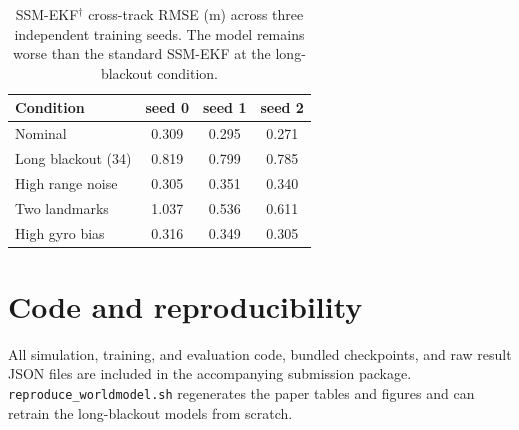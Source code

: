 \documentclass{article}
\begin{document}
\begin{table}[h]
\centering
\small
\caption{SSM-EKF$^\dagger$ cross-track RMSE (m) across three independent training seeds. The model remains worse than the standard SSM-EKF at the long-blackout condition.}
\begin{tabular}{lccc}
\toprule
Condition & seed 0 & seed 1 & seed 2 \\
\midrule
Nominal             & 0.309 & 0.295 & 0.271 \\
Long blackout (34)  & 0.819 & 0.799 & 0.785 \\
High range noise    & 0.305 & 0.351 & 0.340 \\
Two landmarks       & 1.037 & 0.536 & 0.611 \\
High gyro bias      & 0.316 & 0.349 & 0.305 \\
\bottomrule
\end{tabular}
\end{table}

\section{Code and reproducibility}
All simulation, training, and evaluation code, bundled checkpoints, and raw result JSON files are included in the accompanying submission package. \texttt{reproduce\_worldmodel.sh} regenerates the paper tables and figures and can retrain the long-blackout models from scratch.
\end{document}
